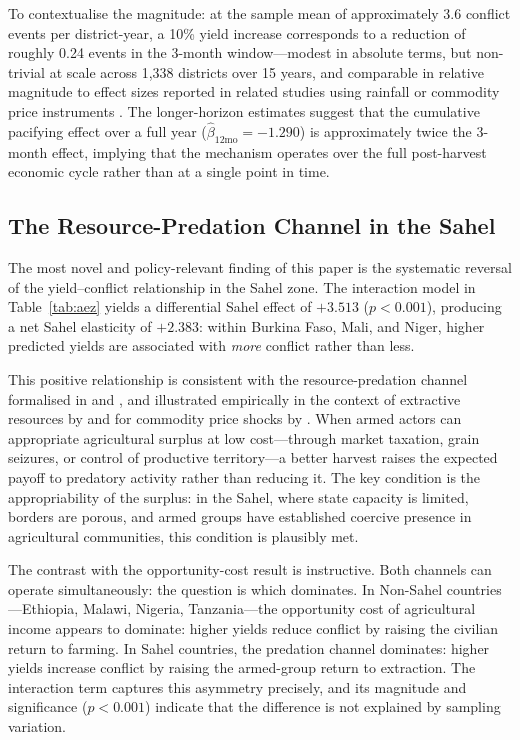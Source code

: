 To contextualise the magnitude: at the sample mean of approximately 3.6 conflict events per district-year, a 10\% yield increase corresponds to a reduction of roughly 0.24 events in the 3-month window---modest in absolute terms, but non-trivial at scale across 1,338 districts over 15 years, and comparable in relative magnitude to effect sizes reported in related studies using rainfall or commodity price instruments \citep{MiguelSatyanathSergenti2004, CoutteynierSoubeyran2014}. The longer-horizon estimates suggest that the cumulative pacifying effect over a full year ($\hat{\beta}_{12\text{mo}} = -1.290$) is approximately twice the 3-month effect, implying that the mechanism operates over the full post-harvest economic cycle rather than at a single point in time.

\subsection{The Resource-Predation Channel in the Sahel}

The most novel and policy-relevant finding of this paper is the systematic reversal of the yield--conflict relationship in the Sahel zone. The interaction model in Table~\ref{tab:aez} yields a differential Sahel effect of $+3.513$ ($p < 0.001$), producing a net Sahel elasticity of $+2.383$: within Burkina Faso, Mali, and Niger, higher predicted yields are associated with \textit{more} conflict rather than less.

This positive relationship is consistent with the resource-predation channel formalised in \citet{Grossman1991} and \citet{DalBoDalBo2011}, and illustrated empirically in the context of extractive resources by \citet{Berman_etal2017} and for commodity price shocks by \citet{DubeVargas2013}. When armed actors can appropriate agricultural surplus at low cost---through market taxation, grain seizures, or control of productive territory---a better harvest raises the expected payoff to predatory activity rather than reducing it. The key condition is the appropriability of the surplus: in the Sahel, where state capacity is limited, borders are porous, and armed groups have established coercive presence in agricultural communities, this condition is plausibly met.

The contrast with the opportunity-cost result is instructive. Both channels can operate simultaneously: the question is which dominates. In Non-Sahel countries---Ethiopia, Malawi, Nigeria, Tanzania---the opportunity cost of agricultural income appears to dominate: higher yields reduce conflict by raising the civilian return to farming. In Sahel countries, the predation channel dominates: higher yields increase conflict by raising the armed-group return to extraction. The interaction term captures this asymmetry precisely, and its magnitude and significance ($p < 0.001$) indicate that the difference is not explained by sampling variation.

